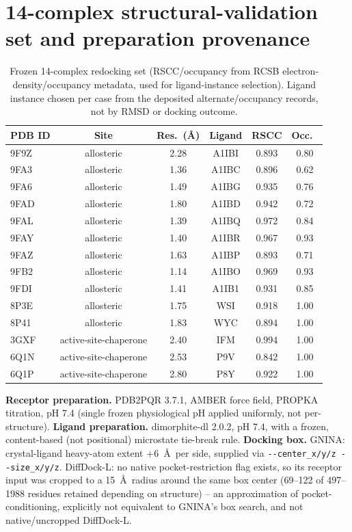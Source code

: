 \documentclass{article}
\begin{document}
\FloatBarrier
\section{14-complex structural-validation set and preparation provenance}
\label{app:c}

\begin{table}[h]
\centering
\footnotesize
\begin{tabular}{lccccc}
\toprule
PDB ID & Site & Res.\ (\AA) & Ligand & RSCC & Occ.\ \\
\midrule
9F9Z & allosteric & 2.28 & A1IBI & 0.893 & 0.80 \\
9FA3 & allosteric & 1.36 & A1IBC & 0.896 & 0.62 \\
9FA6 & allosteric & 1.49 & A1IBG & 0.935 & 0.76 \\
9FAD & allosteric & 1.80 & A1IBD & 0.942 & 0.72 \\
9FAL & allosteric & 1.39 & A1IBQ & 0.972 & 0.84 \\
9FAY & allosteric & 1.40 & A1IBR & 0.967 & 0.93 \\
9FAZ & allosteric & 1.63 & A1IBP & 0.893 & 0.71 \\
9FB2 & allosteric & 1.14 & A1IBO & 0.969 & 0.93 \\
9FDI & allosteric & 1.41 & A1IB1 & 0.931 & 0.85 \\
8P3E & allosteric & 1.75 & WSI & 0.918 & 1.00 \\
8P41 & allosteric & 1.83 & WYC & 0.894 & 1.00 \\
3GXF & active-site-chaperone & 2.40 & IFM & 0.994 & 1.00 \\
6Q1N & active-site-chaperone & 2.53 & P9V & 0.842 & 1.00 \\
6Q1P & active-site-chaperone & 2.80 & P8Y & 0.922 & 1.00 \\
\bottomrule
\end{tabular}
\caption{Frozen 14-complex redocking set (RSCC/occupancy from RCSB electron-density/occupancy metadata, used for ligand-instance selection). Ligand instance chosen per case from the deposited alternate/occupancy records, not by RMSD or docking outcome.}
\end{table}

\textbf{Receptor preparation.} PDB2PQR 3.7.1, AMBER force field, PROPKA titration, pH 7.4 (single frozen physiological pH applied uniformly, not per-structure). \textbf{Ligand preparation.} dimorphite-dl 2.0.2, pH 7.4, with a frozen, content-based (not positional) microstate tie-break rule. \textbf{Docking box.} GNINA: crystal-ligand heavy-atom extent $+6$~\AA\ per side, supplied via \texttt{-{}-center\_x/y/z -{}-size\_x/y/z}. DiffDock-L: no native pocket-restriction flag exists, so its receptor input was cropped to a 15~\AA\ radius around the same box center (69--122 of 497--1988 residues retained depending on structure) -- an approximation of pocket-conditioning, explicitly not equivalent to GNINA's box search, and not native/uncropped DiffDock-L.
\end{document}
